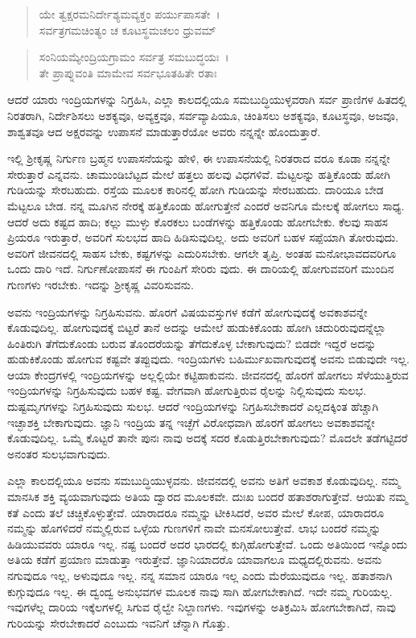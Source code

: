 \begin{verse}
ಯೇ ತ್ವಕ್ಷರಮನಿರ್ದೇಶ್ಯಮವ್ಯಕ್ತಂ ಪರ್ಯುಪಾಸತೇ~।\\ಸರ್ವತ್ರಗಮಚಿಂತ್ಯಂ ಚ ಕೂಟಸ್ಥಮಚಲಂ ಧ್ರುವಮ್ 
\end{verse}

\begin{verse}
ಸಂನಿಯಮ್ಯೇಂದ್ರಿಯಗ್ರಾಮಂ ಸರ್ವತ್ರ ಸಮಬುದ್ಧಯಃ~।\\ತೇ ಪ್ರಾಪ್ನುವಂತಿ ಮಾಮೇವ ಸರ್ವಭೂತಹಿತೇ ರತಾಃ 
\end{verse}

{\small ಆದರೆ ಯಾರು ಇಂದ್ರಿಯಗಳನ್ನು ನಿಗ್ರಹಿಸಿ, ಎಲ್ಲಾ ಕಾಲದಲ್ಲಿಯೂ ಸಮಬುದ್ಧಿಯುಳ್ಳವರಾಗಿ ಸರ್ವ ಪ್ರಾಣಿಗಳ ಹಿತದಲ್ಲಿ ನಿರತರಾಗಿ, ನಿರ್ದೇಶಿಸಲು ಅಶಕ್ಯವೂ, ಅವ್ಯಕ್ತವೂ, ಸರ್ವವ್ಯಾಪಿಯೂ, ಚಿಂತಿಸಲು ಅಶಕ್ಯವೂ, ಕೂಟಸ್ಥವೂ, ಅಜವೂ, ಶಾಶ್ವತವೂ ಆದ ಅಕ್ಷರವನ್ನು ಉಪಾಸನೆ ಮಾಡುತ್ತಾರೆಯೋ ಅವರು ನನ್ನನ್ನೇ ಹೊಂದುತ್ತಾರೆ.}

ಇಲ್ಲಿ ಶ‍್ರೀಕೃಷ್ಣ ನಿರ್ಗುಣ ಬ್ರಹ್ಮನ ಉಪಾಸನೆಯನ್ನು ಹೇಳಿ, ಈ ಉಪಾಸನೆಯಲ್ಲಿ ನಿರತರಾದ ವರೂ ಕೂಡಾ ನನ್ನನ್ನೇ ಸೇರುತ್ತಾರೆ ಎನ್ನವನು. ಚಾಮುಂಡಿಬೆಟ್ಟದ ಮೇಲೆ ಹತ್ತಲು ಹಲವು ವಿಧಗಳಿವೆ. ಮೆಟ್ಟಲನ್ನು ಹತ್ತಿಕೊಂಡು ಹೋಗಿ ಗುಡಿಯನ್ನು ಸೇರಬಹುದು. ರಸ್ತೆಯ ಮೂಲಕ ಕಾರಿನಲ್ಲಿ ಹೋಗಿ ಗುಡಿಯನ್ನು ಸೇರಬಹುದು. ದಾರಿಯೂ ಬೇಡ ಮೆಟ್ಟಲೂ ಬೇಡ. ನನ್ನ ಮೂಗಿನ ನೇರಕ್ಕೆ ಹತ್ತಿಕೊಂಡು ಹೋಗುತ್ತೇನೆ ಎಂದರೆ ಅವನಿಗೂ ಮೇಲಕ್ಕೆ ಹೋಗಲು ಸಾಧ್ಯ. ಆದರೆ ಅದು ಕಷ್ಟದ ಹಾದಿ; ಕಲ್ಲು ಮುಳ್ಳು ಕೊರಕಲು ಬಂಡೆಗಳನ್ನು ಹತ್ತಿಕೊಂಡು ಹೋಗಬೇಕು. ಕೆಲವು ಸಾಹಸ ಪ್ರಿಯರೂ ಇರುತ್ತಾರೆ, ಅವರಿಗೆ ಸುಲಭದ ಹಾದಿ ಹಿಡಿಸುವುದಿಲ್ಲ. ಅದು ಅವರಿಗೆ ಬಹಳ ಸಪ್ಪೆಯಾಗಿ ತೋರುವುದು. ಅವರಿಗೆ ಜೀವನದಲ್ಲಿ ಸಾಹಸ ಬೇಕು, ಕಷ್ಟಗಳನ್ನು ಎದುರಿಸಬೇಕು. ಆಗಲೇ ತೃಪ್ತಿ. ಅಂತಹ ಮನೋಭಾವದವರಿಗೂ ಒಂದು ದಾರಿ ಇದೆ. ನಿರ್ಗುಣೋಪಾಸನೆ ಈ ಗುಂಪಿಗೆ ಸೇರಿರು ವುದು. ಈ ದಾರಿಯಲ್ಲಿ ಹೋಗುವವರಿಗೆ ಮುಂದಿನ ಗುಣಗಳು ಇರಬೇಕು. ಇದನ್ನು ಶ‍್ರೀಕೃಷ್ಣ ವಿವರಿಸುವನು.

ಅವನು ಇಂದ್ರಿಯಗಳನ್ನು ನಿಗ್ರಹಿಸುವನು. ಹೊರಗೆ ವಿಷಯವಸ್ತುಗಳ ಕಡೆಗೆ ಹೋಗುವುದಕ್ಕೆ ಅವಕಾಶವನ್ನೇ ಕೊಡುವುದಿಲ್ಲ. ಹೋಗುವುದಕ್ಕೆ ಬಿಟ್ಟರೆ ತಾನೆ ಅದನ್ನು ಆಮೇಲೆ ಹುಡುಕಿಕೊಂಡು ಹೋಗಿ ಚದುರಿರುವುದನ್ನೆಲ್ಲಾ ಹಿಂತಿರುಗಿ ತೆಗೆದುಕೊಂಡು ಬರುವ ತೊಂದರೆಯನ್ನು ತೆಗೆದುಕೊಳ್ಳ ಬೇಕಾಗುವುದು? ಬಿಡದೇ ಇದ್ದರೆ ಅದನ್ನು ಹುಡುಕಿಕೊಂಡು ಹೋಗುವ ಕಷ್ಟವೇ ತಪ್ಪುವುದು. ಇಂದ್ರಿಯಗಳು ಬಹಿರ್ಮುಖವಾಗುವುದಕ್ಕೆ ಅವನು ಬಿಡುವುದೇ ಇಲ್ಲ. ಆಯಾ ಕೇಂದ್ರಗಳಲ್ಲಿ ಇಂದ್ರಿಯಗಳನ್ನು ಅಲ್ಲಲ್ಲಿಯೇ ಕಟ್ಟಿಹಾಕುವನು. ಜೀವನದಲ್ಲಿ ಹೊರಗೆ ಹೋಗಲು ಸೆಳೆಯುತ್ತಿರುವ ಇಂದ್ರಿಯಗಳನ್ನು ನಿಗ್ರಹಿಸುವುದು ಬಹಳ ಕಷ್ಟ. ವೇಗವಾಗಿ ಹೋಗುತ್ತಿರುವ ರೈಲನ್ನು ನಿಲ್ಲಿಸುವುದು ಸುಲಭ. ದುಷ್ಟಮೃಗಗಳನ್ನು ನಿಗ್ರಹಿಸುವುದು ಸುಲಭ. ಆದರೆ ಇಂದ್ರಿಯಗಳನ್ನು ನಿಗ್ರಹಿಸಬೇಕಾದರೆ ಎಲ್ಲದಕ್ಕಿಂತ ಹೆಚ್ಚಾಗಿ ಇಚ್ಛಾಶಕ್ತಿ ಬೇಕಾಗುವುದು. ಜ್ಞಾನಿ ಇಂದ್ರಿಯ ತನ್ನ ಇಚ್ಛೆಗೆ ವಿರೋಧವಾಗಿ ಹೊರಗೆ ಹೋಗಲು ಅವಕಾಶವನ್ನೇ ಕೊಡುವುದಿಲ್ಲ. ಒಮ್ಮೆ ಕೊಟ್ಟರೆ ತಾನೇ ಪುನಃ ನಾವು ಅದಕ್ಕೆ ಸದರ ಕೊಡುತ್ತಿರಬೇಕಾಗುವುದು? ಮೊದಲೇ ತಡೆಗಟ್ಟಿದರೆ ಅನಂತರ ಸುಲಭವಾಗುವುದು.

ಎಲ್ಲಾ ಕಾಲದಲ್ಲಿಯೂ ಅವನು ಸಮಬುದ್ಧಿಯುಳ್ಳವನು. ಜೀವನದಲ್ಲಿ ಅವನು ಅತಿಗೆ ಅವಕಾಶ ಕೊಡುವುದಿಲ್ಲ. ನಮ್ಮ ಮಾನಸಿಕ ಶಕ್ತಿ ವ್ಯಯವಾಗುವುದು ಅತಿಯ ದ್ವಾರದ ಮೂಲಕವೇ. ದುಃಖ ಬಂದರೆ ಹತಾಶರಾಗುತ್ತೇವೆ. ಆಯಿತು ನಮ್ಮ ಕತೆ ಎಂದು ತಲೆ ಚಚ್ಚಿಕೊಳ್ಳುತ್ತೇವೆ. ಯಾರಾದರೂ ನಮ್ಮನ್ನು ಟೀಕಿಸಿದರೆ, ಅವರ ಮೇಲೆ ಕೋಪ, ಯಾರಾದರೂ ನಮ್ಮನ್ನು ಹೊಗಳಿದರೆ ನಮ್ಮಲ್ಲಿರುವ ಒಳ್ಳೆಯ ಗುಣಗಳಿಗೆ ನಾವೇ ಮನಸೋಲುತ್ತೇವೆ. ಲಾಭ ಬಂದರೆ ನಮ್ಮನ್ನು ಹಿಡಿಯುವವರು ಯಾರೂ ಇಲ್ಲ. ನಷ್ಟ ಬಂದರೆ ಅದರ ಭಾರದಲ್ಲಿ ಕುಗ್ಗಿಹೋಗುತ್ತೇವೆ. ಒಂದು ಅತಿಯಿಂದ ಇನ್ನೊಂದು ಅತಿಯ ಕಡೆಗೆ ಪ್ರಯಾಣ ಮಾಡುತ್ತಾ ಇರುತ್ತೇವೆ. ಜ್ಞಾನಿಯಾದರೊ ಯಾವಾಗಲೂ ಮಧ್ಯದಲ್ಲಿರುವನು. ಅವನು ನಗುವುದೂ ಇಲ್ಲ, ಅಳುವುದೂ ಇಲ್ಲ. ನನ್ನ ಸಮಾನ ಯಾರೂ ಇಲ್ಲ ಎಂದು ಮೆರೆಯುವುದೂ ಇಲ್ಲ. ಹತಾಶನಾಗಿ ಕುಗ್ಗುವುದೂ ಇಲ್ಲ. ಈ ದ್ವಂದ್ವ ಅನುಭವಗಳ ಮೂಲಕ ನಾವು ಸಾಗಿ ಹೋಗಬೇಕಾಗಿದೆ. ಇದೇ ನಮ್ಮ ಗುರಿಯಲ್ಲ. ಇವುಗಳೆಲ್ಲ ದಾರಿಯ ಇಕ್ಕೆಲಗಳಲ್ಲಿ ಸಿಗುವ ರೈಲ್ವೇ ನಿಲ್ದಾಣಗಳು. ಇವುಗಳನ್ನು ಅತಿಕ್ರಮಿಸಿ ಹೋಗಬೇಕಾಗಿದೆ, ನಾವು ಗುರಿಯನ್ನು ಸೇರಬೇಕಾದರೆ ಎಂಬುದು ಇವನಿಗೆ ಚೆನ್ನಾಗಿ ಗೊತ್ತು.

